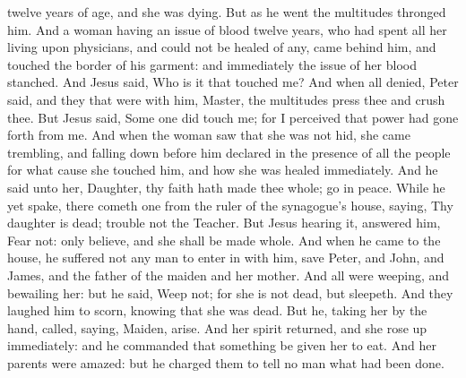 twelve years of age, and she was dying. But as he went the multitudes thronged him.  And a woman having an issue of blood twelve years, who had spent all her living upon physicians, and could not be healed of any, came behind him, and touched the border of his garment: and immediately the issue of her blood stanched. And Jesus said, Who is it that touched me? And when all denied, Peter said, and they that were with him, Master, the multitudes press thee and crush thee. But Jesus said, Some one did touch me; for I perceived that power had gone forth from me. And when the woman saw that she was not hid, she came trembling, and falling down before him declared in the presence of all the people for what cause she touched him, and how she was healed immediately. And he said unto her, Daughter, thy faith hath made thee whole; go in peace.  While he yet spake, there cometh one from the ruler of the synagogue’s house, saying, Thy daughter is dead; trouble not the Teacher. But Jesus hearing it, answered him, Fear not: only believe, and she shall be made whole. And when he came to the house, he suffered not any man to enter in with him, save Peter, and John, and James, and the father of the maiden and her mother. And all were weeping, and bewailing her: but he said, Weep not; for she is not dead, but sleepeth. And they laughed him to scorn, knowing that she was dead. But he, taking her by the hand, called, saying, Maiden, arise. And her spirit returned, and she rose up immediately: and he commanded that something be given her to eat. And her parents were amazed: but he charged them to tell no man what had been done. 

